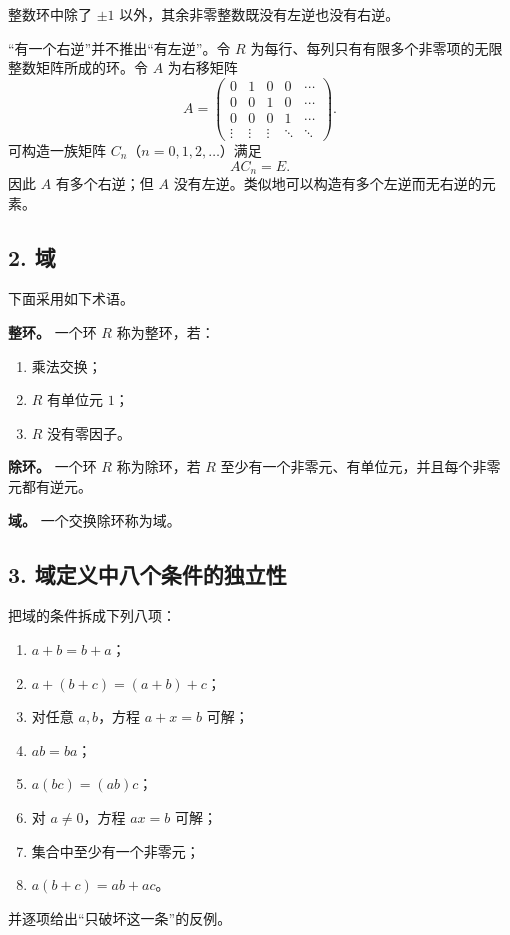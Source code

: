 整数环中除了 $\pm1$ 以外，其余非零整数既没有左逆也没有右逆。

“有一个右逆”并不推出“有左逆”。令 $R$ 为每行、每列只有有限多个非零项的无限整数矩阵所成的环。令 $A$ 为右移矩阵
\[
A=\begin{pmatrix}
0&1&0&0&\cdots\\
0&0&1&0&\cdots\\
0&0&0&1&\cdots\\
\vdots&\vdots&\vdots&\ddots&\ddots
\end{pmatrix}.
\]
可构造一族矩阵 $C_n$（$n=0,1,2,\ldots$）满足
\[
AC_n=E.
\]
因此 $A$ 有多个右逆；但 $A$ 没有左逆。类似地可以构造有多个左逆而无右逆的元素。

\subsection*{2. 域}

下面采用如下术语。

\textbf{整环。} 一个环 $R$ 称为整环，若：
\begin{enumerate}[label=\roman*),leftmargin=3em]
\item 乘法交换；
\item $R$ 有单位元 $1$；
\item $R$ 没有零因子。
\end{enumerate}

\textbf{除环。} 一个环 $R$ 称为除环，若 $R$ 至少有一个非零元、有单位元，并且每个非零元都有逆元。

\textbf{域。} 一个交换除环称为域。

\subsection*{3. 域定义中八个条件的独立性}

把域的条件拆成下列八项：
\begin{enumerate}[label=\roman*),leftmargin=3em]
\item $a+b=b+a$；
\item $a+(b+c)=(a+b)+c$；
\item 对任意 $a,b$，方程 $a+x=b$ 可解；
\item $ab=ba$；
\item $a(bc)=(ab)c$；
\item 对 $a\ne0$，方程 $ax=b$ 可解；
\item 集合中至少有一个非零元；
\item $a(b+c)=ab+ac$。
\end{enumerate}
并逐项给出“只破坏这一条”的反例。

